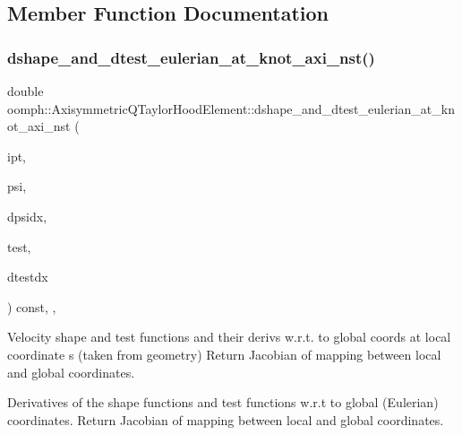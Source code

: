 \subsection{Member Function Documentation}
\mbox{\label{classoomph_1_1AxisymmetricQTaylorHoodElement_abd3de2e051bca2f697560e907a53abde}} 
\subsubsection{\texorpdfstring{dshape\+\_\+and\+\_\+dtest\+\_\+eulerian\+\_\+at\+\_\+knot\+\_\+axi\+\_\+nst()}{dshape\_and\_dtest\_eulerian\_at\_knot\_axi\_nst()}\hspace{0.1cm}{\footnotesize\ttfamily [1/2]}}
{\footnotesize\ttfamily double oomph\+::\+Axisymmetric\+Q\+Taylor\+Hood\+Element\+::dshape\+\_\+and\+\_\+dtest\+\_\+eulerian\+\_\+at\+\_\+knot\+\_\+axi\+\_\+nst (\begin{DoxyParamCaption}\item[{const unsigned \&}]{ipt,  }\item[{\hyperlink{classoomph_1_1Shape}{Shape} \&}]{psi,  }\item[{\hyperlink{classoomph_1_1DShape}{D\+Shape} \&}]{dpsidx,  }\item[{\hyperlink{classoomph_1_1Shape}{Shape} \&}]{test,  }\item[{\hyperlink{classoomph_1_1DShape}{D\+Shape} \&}]{dtestdx }\end{DoxyParamCaption}) const\hspace{0.3cm}{\ttfamily [inline]}, {\ttfamily [protected]}, {\ttfamily [virtual]}}



Velocity shape and test functions and their derivs w.\+r.\+t. to global coords at local coordinate s (taken from geometry) Return Jacobian of mapping between local and global coordinates. 

Derivatives of the shape functions and test functions w.\+r.\+t to global (Eulerian) coordinates. Return Jacobian of mapping between local and global coordinates. 


